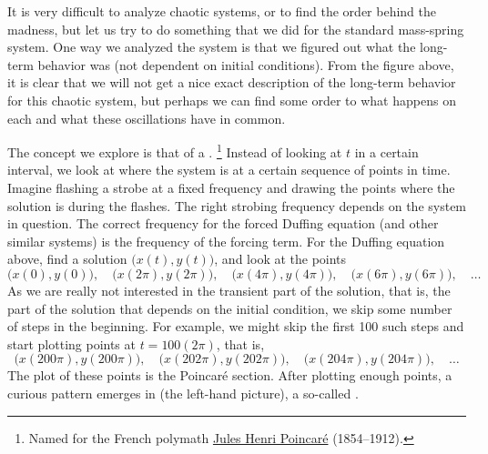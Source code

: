 It is very difficult to analyze chaotic systems, or to find the
order behind the madness, but let us try to do something that we did for
the standard mass-spring system.  One way we analyzed
the system is that we figured out what the long-term behavior was (not
dependent on initial conditions).  From the figure above, it is clear
that we will not get a nice exact description of the long-term behavior
for this chaotic system, but
perhaps we can find some order to what happens on each
and what these oscillations have in common.

The concept we explore
is that of a \emph{}.%
\footnote{Named for the French polymath
\href{https://en.wikipedia.org/wiki/Henri_Poincar\%C3\%A9}{Jules Henri
Poincar\'e} (1854--1912).}  Instead of 
looking at $t$ in a certain interval, we look at where the
system is at a certain sequence of points in time.
Imagine flashing a strobe at a
fixed frequency and drawing the points where the solution is during the flashes.
The right strobing frequency
depends on the system in question.
The
correct frequency for the forced Duffing equation (and other similar
systems) is the frequency of the forcing term.
For the Duffing equation above, find a solution
$\bigl(x(t),y(t)\bigr)$, and look at the points
\begin{equation*}
\bigl(x(0),y(0)\bigr), \quad
\bigl(x(2\pi),y(2\pi)\bigr), \quad
\bigl(x(4\pi),y(4\pi)\bigr), \quad
\bigl(x(6\pi),y(6\pi)\bigr), \quad \ldots
\end{equation*}
As we are really not interested in the transient part of the solution, that
is, the part of the solution that depends on the initial condition, we 
skip some number of steps in the beginning.  For example, we might skip the first 100 such
steps and start plotting points at $t = 100(2\pi)$, that is,
\begin{equation*}
\bigl(x(200\pi),y(200\pi)\bigr), \quad
\bigl(x(202\pi),y(202\pi)\bigr), \quad
\bigl(x(204\pi),y(204\pi)\bigr), \quad \ldots
\end{equation*}
The plot of these points is the Poincar\'e section.
After plotting enough points, a curious pattern emerges in
 (the left-hand picture), a so-called
\emph{}.

\begin{myfig}
\capstart
\caption{Strange attractor.  The left plot 
is with no phase shift, the right plot has phase shift
$\nicefrac{\pi}{4}$. \label{nlin:strange}}
\end{myfig}

